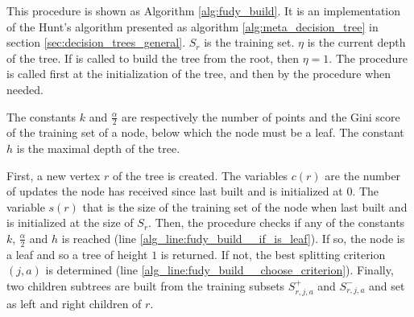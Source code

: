 This procedure is shown as Algorithm \ref{alg:fudy_build}. It is an implementation of the Hunt's algorithm presented as algorithm \ref{alg:meta_decision_tree} in section \ref{sec:decision_trees_general}. $S_r$ is the training set. $\eta$ is the current depth of the tree. If \AlgoBuild{} is called to build the tree from the root, then $\eta=1$. The procedure is called first at the initialization of the tree, and then by the \AlgoUpdate{} procedure when needed.

The constants $k$ and $\frac{\alpha}{2}$ are respectively the number of points and the Gini score of the training set of a node, below which the node must be a leaf. The constant $h$ is the maximal depth of the tree.

First, a new vertex $r$ of the tree is created. The variables $c(r)$ are the number of updates the node has received since last built and is initialized at $0$. The variable $s(r)$ that is the size of the training set of the node when last built and is initialized at the size of $S_r$. Then, the procedure checks if any of the constants $k$, $\frac{\alpha}{2}$ and $h$ is reached (line \ref{alg_line:fudy_build__if_is_leaf}). If so, the node is a leaf and so a tree of height $1$ is returned. If not, the best splitting criterion $(j,a)$ is determined (line \ref{alg_line:fudy_build__choose_criterion}). Finally, two children subtrees are built from the training subsets $S^+_{r,j,a}$ and $S^-_{r,j,a}$ and set as left and right children of $r$.

